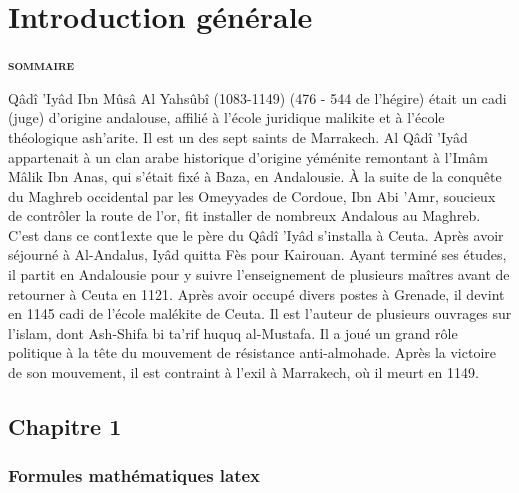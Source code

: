 \chapter{Introduction générale}
\vspace{20pt}
\begin{center} {\scshape\bfseries sommaire} \end{center}
\startcontents[chapters]

\smash{\rule{\textwidth}{.4pt}}
\smash{\rule{\textwidth}{.4pt}}

\vspace{20pt}

 Qâdî 'Iyâd Ibn Mûsâ Al Yahsûbî (1083-1149) (476 - 544 de l'hégire) était un cadi (juge) d'origine andalouse, affilié à l'école juridique malikite et à l'école théologique ash'arite. Il est un des sept saints de Marrakech.
Al Qâdî 'Iyâd appartenait à un clan arabe historique d'origine yéménite remontant à l'Imâm Mâlik Ibn Anas, qui s'était fixé à Baza, en Andalousie. À la suite de la conquête du Maghreb occidental par les Omeyyades de Cordoue, Ibn Abi 'Amr, soucieux de contrôler la route de l'or, fit installer de nombreux Andalous au Maghreb. C'est dans ce cont1exte que le père du Qâdî 'Iyâd s'installa à Ceuta.
Après avoir séjourné à Al-Andalus, Iyâd quitta Fès pour Kairouan.
Ayant terminé ses études, il partit en Andalousie pour y suivre l'enseignement de plusieurs maîtres avant de retourner à Ceuta en 1121. Après avoir occupé divers postes à Grenade, il devint en 1145 cadi de l'école malékite de Ceuta. Il est l'auteur de plusieurs ouvrages sur l'islam, dont Ash-Shifa bi ta'rif huquq al-Mustafa. Il a joué un grand rôle politique à la tête du mouvement de résistance anti-almohade. Après la victoire de son mouvement, il est contraint à l'exil à Marrakech, où il meurt en 1149.

\section{Chapitre 1}





\subsection{Formules mathématiques latex}

